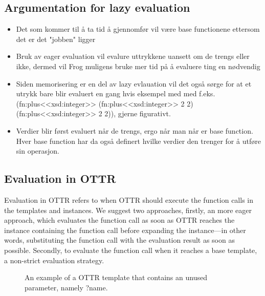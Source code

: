 \subsection{Argumentation for lazy evaluation}
\begin{itemize}
    \item Det som kommer til å ta tid å gjennomfør vil være base functionene ettersom det er det "jobben" ligger
    \item Bruk av eager evaluation vil evalure uttrykkene uansett om de trengs eller ikke, dermed vil Frog muligens bruke mer tid på å evaluere ting en nødvendig 
    \item Siden memorisering er en del av lazy evlauation vil det også sørge for at et utrykk bare blir evaluert en gang hvis eksempel med med f.eks. (fn:plus<<xsd:integer>> (fn:plus<<xsd:integer>> 2 2) (fn:plus<<xsd:integer>> 2 2)), gjerne figurativt.
    \item Verdier blir først evaluert når de trengs, ergo når man når er base function. Hver base function har da også definert hvilke verdier den trenger for å utføre sin operasjon. 
\end{itemize}

\subsection{Evaluation in OTTR}
Evaluation in OTTR refers to when OTTR should execute the function calls in the templates and instances. We suggest two approaches, firstly, an more eager approach, which evaluates the function call as soon as OTTR reaches the instance containing the function call before expanding the instance—in other words, substituting the function call with the evaluation result as soon as possible. Secondly, to evaluate the function call when it reaches a base template, a non-strict evaluation strategy.

\begin{figure}
    
    \caption{An example of a OTTR template that contains an unused parameter, namely ?name. }
    \label{fig:ottr_evaluation_example}
\end{figure}

